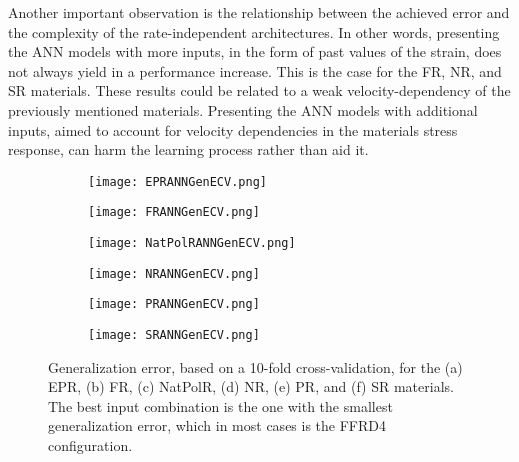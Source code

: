 Another important observation is the relationship between the achieved error and the complexity of the rate-independent architectures. In other words, presenting the ANN models with more inputs, in the form of past values of the strain, does not always yield in a performance increase. This is the case for the FR, NR, and SR materials. These results could be related to a weak velocity-dependency of the previously mentioned materials. Presenting the ANN models with additional inputs, aimed to account for velocity dependencies in the materials stress response, can harm the learning process rather than aid it.

\begin{figure}[htbp!]
	\centering
    \begin{subfigure}[b]{0.49\textwidth}
        \centering
        \texttt{[image: EPRANNGenECV.png]}
        \caption{}
        \label{fig:ANNGenEPR}
    \end{subfigure}
    \begin{subfigure}[b]{0.49\textwidth}
        \centering
        \texttt{[image: FRANNGenECV.png]}
        \caption{}
        \label{fig:ANNGenFR}
    \end{subfigure}
    \begin{subfigure}[b]{0.49\textwidth}
        \centering
        \texttt{[image: NatPolRANNGenECV.png]}
        \caption{}
        \label{fig:ANNGenNR}
    \end{subfigure}
    \begin{subfigure}[b]{0.49\textwidth}
        \centering
        \texttt{[image: NRANNGenECV.png]}
        \caption{}
        \label{fig:ANNGenNatPolR}
    \end{subfigure}
	\begin{subfigure}[b]{0.49\textwidth}
		\centering
		\texttt{[image: PRANNGenECV.png]}
		\caption{}
		\label{fig:ANNGenPR}
	\end{subfigure}
	\begin{subfigure}[b]{0.49\textwidth}
		\centering
		\texttt{[image: SRANNGenECV.png]}
		\caption{}
		\label{fig:ANNGenSR}
	\end{subfigure}
    \caption{Generalization error, based on a 10-fold cross-validation, for the (a) EPR, (b) FR, (c) NatPolR, (d) NR, (e) PR, and (f) SR materials. The best input combination is the one with the smallest generalization error, which in most cases is the FFRD4 configuration.}
    \label{fig:ANNGen4}
\end{figure}

